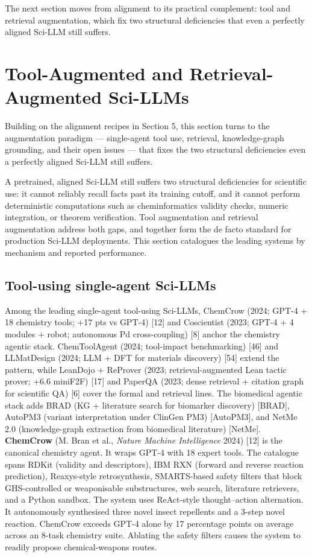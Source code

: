 The next section moves from alignment to its practical complement: tool and retrieval augmentation, which fix two structural deficiencies that even a perfectly aligned Sci-LLM still suffers.

\section{Tool-Augmented and Retrieval-Augmented Sci-LLMs}\label{tool-augmented-and-retrieval-augmented-sci-llms}

Building on the alignment recipes in Section 5, this section turns to the augmentation paradigm --- single-agent tool use, retrieval, knowledge-graph grounding, and their open issues --- that fixes the two structural deficiencies even a perfectly aligned Sci-LLM still suffers.

A pretrained, aligned Sci-LLM still suffers two structural deficiencies for scientific use: it cannot reliably recall facts past its training cutoff, and it cannot perform deterministic computations such as cheminformatics validity checks, numeric integration, or theorem verification. Tool augmentation and retrieval augmentation address both gaps, and together form the de facto standard for production Sci-LLM deployments. This section catalogues the leading systems by mechanism and reported performance.

\subsection{Tool-using single-agent Sci-LLMs}\label{tool-using-single-agent-sci-llms}

Among the leading single-agent tool-using Sci-LLMs, ChemCrow (2024; GPT-4 + 18 chemistry tools; +17 pts vs GPT-4) {[}12{]} and Coscientist (2023; GPT-4 + 4 modules + robot; autonomous Pd cross-coupling) {[}8{]} anchor the chemistry agentic stack. ChemToolAgent (2024; tool-impact benchmarking) {[}46{]} and LLMatDesign (2024; LLM + DFT for materials discovery) {[}54{]} extend the pattern, while LeanDojo + ReProver (2023; retrieval-augmented Lean tactic prover; +6.6 miniF2F) {[}17{]} and PaperQA (2023; dense retrieval + citation graph for scientific QA) {[}6{]} cover the formal and retrieval lines. The biomedical agentic stack adds BRAD (KG + literature search for biomarker discovery) {[}BRAD{]}, AutoPM3 (variant interpretation under ClinGen PM3) {[}AutoPM3{]}, and NetMe 2.0 (knowledge-graph extraction from biomedical literature) {[}NetMe{]}. \textbf{ChemCrow} (M. Bran et al., \emph{Nature Machine Intelligence} 2024) {[}12{]} is the canonical chemistry agent. It wraps GPT-4 with 18 expert tools. The catalogue spans RDKit (validity and descriptors), IBM RXN (forward and reverse reaction prediction), Reaxys-style retrosynthesis, SMARTS-based safety filters that block GHS-controlled or weaponisable substructures, web search, literature retrievers, and a Python sandbox. The system uses ReAct-style thought--action alternation. It autonomously synthesised three novel insect repellents and a 3-step novel reaction. ChemCrow exceeds GPT-4 alone by 17 percentage points on average across an 8-task chemistry suite. Ablating the safety filters causes the system to readily propose chemical-weapons routes.

